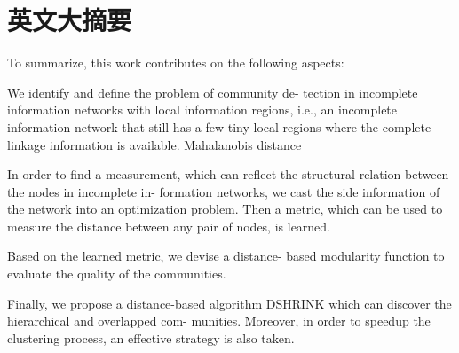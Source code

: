 \chapter{英文大摘要}
\label{chap:updatelog}

To summarize, this
work contributes on the following aspects:

We identify and define the problem of community de-
tection in incomplete information networks with local
information regions, i.e., an incomplete information
network that still has a few tiny local regions where
the complete linkage information is available.
Mahalanobis distance

In order to find a measurement, which can reflect the
structural relation between the nodes in incomplete in-
formation networks, we cast the side information of the
network into an optimization problem. Then a metric,
which can be used to measure the distance between
any pair of nodes, is learned.

Based on the learned metric, we devise a distance-
based modularity function to evaluate the quality of
the communities.

Finally, we propose a distance-based algorithm DSHRINK
which can discover the hierarchical and overlapped com-
munities. Moreover, in order to speedup the clustering
process, an effective strategy is also taken.

